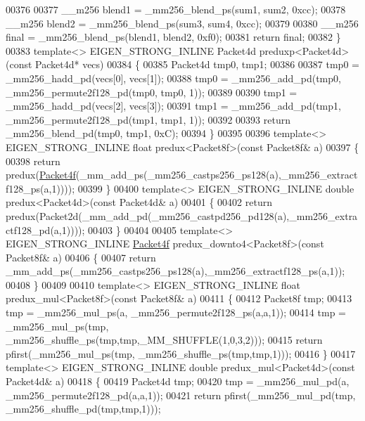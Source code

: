 \begin{DoxyCode}
{{00376 
00377     \_\_m256 blend1 = \_mm256\_blend\_ps(sum1, sum2, 0xcc);
00378     \_\_m256 blend2 = \_mm256\_blend\_ps(sum3, sum4, 0xcc);
00379 
00380     \_\_m256 \textcolor{keyword}{final} = \_mm256\_blend\_ps(blend1, blend2, 0xf0);
00381     \textcolor{keywordflow}{return} \textcolor{keyword}{final};
00382 \}
00383 \textcolor{keyword}{template}<> EIGEN\_STRONG\_INLINE Packet4d preduxp<Packet4d>(\textcolor{keyword}{const} Packet4d* vecs)
00384 \{
00385  Packet4d tmp0, tmp1;
00386 
00387   tmp0 = \_mm256\_hadd\_pd(vecs[0], vecs[1]);
00388   tmp0 = \_mm256\_add\_pd(tmp0, \_mm256\_permute2f128\_pd(tmp0, tmp0, 1));
00389 
00390   tmp1 = \_mm256\_hadd\_pd(vecs[2], vecs[3]);
00391   tmp1 = \_mm256\_add\_pd(tmp1, \_mm256\_permute2f128\_pd(tmp1, tmp1, 1));
00392 
00393   \textcolor{keywordflow}{return} \_mm256\_blend\_pd(tmp0, tmp1, 0xC);
00394 \}
00395 
00396 \textcolor{keyword}{template}<> EIGEN\_STRONG\_INLINE \textcolor{keywordtype}{float} predux<Packet8f>(\textcolor{keyword}{const} Packet8f& a)
00397 \{
00398   \textcolor{keywordflow}{return} predux(\hyperlink{struct_eigen_1_1internal_1_1_packet4f}{Packet4f}(\_mm\_add\_ps(\_mm256\_castps256\_ps128(a),\_mm256\_extractf128\_ps(a,1))));
00399 \}
00400 \textcolor{keyword}{template}<> EIGEN\_STRONG\_INLINE \textcolor{keywordtype}{double} predux<Packet4d>(\textcolor{keyword}{const} Packet4d& a)
00401 \{
00402   \textcolor{keywordflow}{return} predux(Packet2d(\_mm\_add\_pd(\_mm256\_castpd256\_pd128(a),\_mm256\_extractf128\_pd(a,1))));
00403 \}
00404 
00405 \textcolor{keyword}{template}<> EIGEN\_STRONG\_INLINE \hyperlink{struct_eigen_1_1internal_1_1_packet4f}{Packet4f} predux\_downto4<Packet8f>(\textcolor{keyword}{const} Packet8f& a)
00406 \{
00407   \textcolor{keywordflow}{return} \_mm\_add\_ps(\_mm256\_castps256\_ps128(a),\_mm256\_extractf128\_ps(a,1));
00408 \}
00409 
00410 \textcolor{keyword}{template}<> EIGEN\_STRONG\_INLINE \textcolor{keywordtype}{float} predux\_mul<Packet8f>(\textcolor{keyword}{const} Packet8f& a)
00411 \{
00412   Packet8f tmp;
00413   tmp = \_mm256\_mul\_ps(a, \_mm256\_permute2f128\_ps(a,a,1));
00414   tmp = \_mm256\_mul\_ps(tmp, \_mm256\_shuffle\_ps(tmp,tmp,\_MM\_SHUFFLE(1,0,3,2)));
00415   \textcolor{keywordflow}{return} pfirst(\_mm256\_mul\_ps(tmp, \_mm256\_shuffle\_ps(tmp,tmp,1)));
00416 \}
00417 \textcolor{keyword}{template}<> EIGEN\_STRONG\_INLINE \textcolor{keywordtype}{double} predux\_mul<Packet4d>(\textcolor{keyword}{const} Packet4d& a)
00418 \{
00419   Packet4d tmp;
00420   tmp = \_mm256\_mul\_pd(a, \_mm256\_permute2f128\_pd(a,a,1));
00421   \textcolor{keywordflow}{return} pfirst(\_mm256\_mul\_pd(tmp, \_mm256\_shuffle\_pd(tmp,tmp,1)));
}}
\end{DoxyCode}
